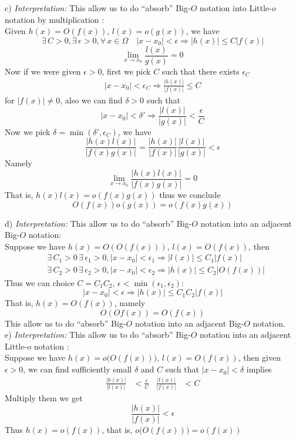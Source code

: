 \documentclass[12pt]{article}
\begin{document}
c) {\sl Interpretation:} This allow us to do ``absorb''  Big-$O$ notation into Little-$o$ notation by multiplication : \\
Given $h(x)=O(f(x))$, $l(x)=o(g(x))$, we have
\[
\exists\, C>0 , \exists\, \epsilon>0, \forall\, x\in\Omega\quad |x-x_0|<\epsilon \Rightarrow |h(x)|\leq C|f(x)|
\]
\[
  \lim_{x\to x_0}\frac{l(x)}{g(x)}=0
  \]
 Now if we were given $\epsilon>0$, first we pick $C$ such that there exists $\epsilon_{C}$
\begin{align*}
 |x-x_0|<\epsilon_{C} \Rightarrow \frac{|h(x)|}{|f(x)|}\leq C
\end{align*}
for $|f(x)|\neq0$, also we can find $\delta>0$ such that
\[
 |x-x_0|<\delta' \Rightarrow \frac{|l(x)|}{|g(x)|} <\frac{\epsilon}{C}
\]
Now we pick $\delta=\min(\delta' ,\epsilon_{C})$, we have
\[
\frac{|h(x)l(x)|}{|f(x)g(x)|}=\frac{|h(x)|}{|f(x)|}\frac{|l(x)|}{|g(x)|}<\epsilon
\]
Namely
\[
\lim_{x\to x_0}\frac{|h(x)l(x)|}{|f(x)g(x)|}=0
\]
That is, $h(x)l(x)=o(f(x)g(x))$ 
thus we conclude %
\[
O(f(x))o(g(x))= o(f(x)g(x))
\]

d) {\sl Interpretation:} This allow us to do ``absorb''  Big-$O$ notation into an adjacent Big-$O$ notation: \\
Suppose we have $h(x)=O(O(f(x)))$, $l(x)=O(f(x))$, then
\begin{align*}
&\exists\, C_1>0\, \exists\, \epsilon_1>0, |x-x_0|<\epsilon_1 \Rightarrow |l(x)|\leq C_1|f(x)|\\
&\exists\, C_2>0\, \exists\, \epsilon_2>0, |x-x_0|<\epsilon_2 \Rightarrow |h(x)|\leq C_2|O(f(x))|
\end{align*}
Thus we can choice $C=C_1C_2$, $\epsilon<\min(\epsilon_1,\epsilon_2)$:
\[
|x-x_0|<\epsilon \Rightarrow |h(x)|\leq C_1C_2|f(x)|
\]
That is, $h(x)=O(f(x))$, namely
\[
O(Of(x))=O(f(x))
\]
This allow us to do ``absorb''  Big-$O$ notation into an adjacent Big-$O$ notation.\\
e) {\sl Interpretation:} This allow us to do ``absorb''  Big-$O$ notation into an adjacent Little-$o$ notation :\\
Suppose we have $h(x)=o\bigl(O(f(x))\bigr)$, $l(x)=O(f(x))$, then given $\epsilon>0$, we can find sufficiently small
$\delta$ and $C$ such that $|x-x_0|<\delta$ implies
\begin{align*}
\frac{|h(x)|}{|l(x)|}&<\frac{\epsilon}{C}&
\frac{|l(x)|}{|f(x)|}&<C
\end{align*}
Multiply them we get 
\[
\frac{|h(x)|}{|f(x)|}<\epsilon
\]
Thus $h(x)=o(f(x))$, that is, $o\bigl(O(f(x))\bigr)=o(f(x))$\\
\eject
\end{document}
